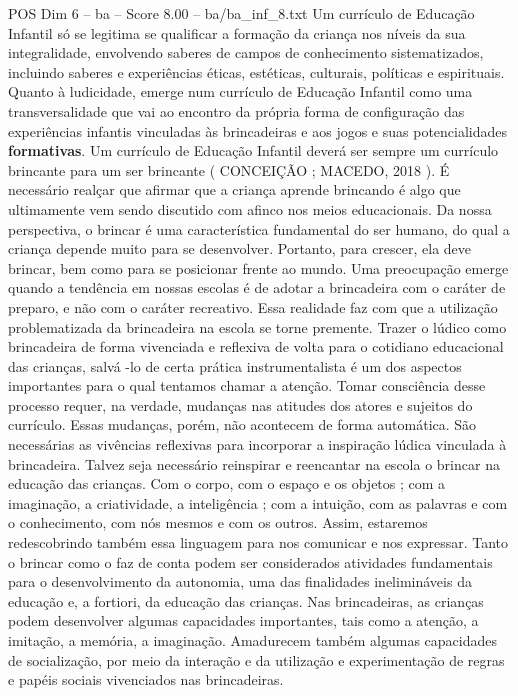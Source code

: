 \begin{textsample}{POS Dim 6 – ba – Score 8.00 – ba/ba\_inf\_8.txt}
Um currículo de Educação Infantil só se legitima se qualificar a formação da criança nos níveis da sua integralidade, envolvendo saberes de campos de conhecimento sistematizados, incluindo saberes e experiências éticas, estéticas, culturais, políticas e espirituais.
Quanto à ludicidade, emerge num currículo de Educação Infantil como uma transversalidade que vai ao encontro da própria forma de configuração das experiências infantis vinculadas às brincadeiras e aos jogos e suas potencialidades \textbf{formativas}.
Um currículo de Educação Infantil deverá ser sempre um currículo brincante para um ser brincante ( CONCEIÇÃO ; MACEDO, 2018 ).
É necessário realçar que afirmar que a criança aprende brincando é algo que ultimamente vem sendo discutido com afinco nos meios educacionais.
Da nossa perspectiva, o brincar é uma característica fundamental do ser humano, do qual a criança depende muito para se desenvolver.
Portanto, para crescer, ela deve brincar, bem como para se posicionar frente ao mundo.
Uma preocupação emerge quando a tendência em nossas escolas é de adotar a brincadeira com o caráter de preparo, e não com o caráter recreativo.
Essa realidade faz com que a utilização problematizada da brincadeira na escola se torne premente.
Trazer o lúdico como brincadeira de forma vivenciada e reflexiva de volta para o cotidiano educacional das crianças, salvá -lo de certa prática instrumentalista é um dos aspectos importantes para o qual tentamos chamar a atenção.
Tomar consciência desse processo requer, na verdade, mudanças nas atitudes dos atores e sujeitos do currículo.
Essas mudanças, porém, não acontecem de forma automática.
São necessárias as vivências reflexivas para incorporar a inspiração lúdica vinculada à brincadeira.
Talvez seja necessário reinspirar e reencantar na escola o brincar na educação das crianças.
Com o corpo, com o espaço e os objetos ; com a imaginação, a criatividade, a inteligência ; com a intuição, com as palavras e com o conhecimento, com nós mesmos e com os outros.
Assim, estaremos redescobrindo também essa linguagem para nos comunicar e nos expressar.
Tanto o brincar como o faz de conta podem ser considerados atividades fundamentais para o desenvolvimento da autonomia, uma das finalidades inelimináveis da educação e, a fortiori, da educação das crianças.
Nas brincadeiras, as crianças podem desenvolver algumas capacidades importantes, tais como a atenção, a imitação, a memória, a imaginação.
Amadurecem também algumas capacidades de socialização, por meio da interação e da utilização e experimentação de regras e papéis sociais vivenciados nas brincadeiras.

\end{textsample}
